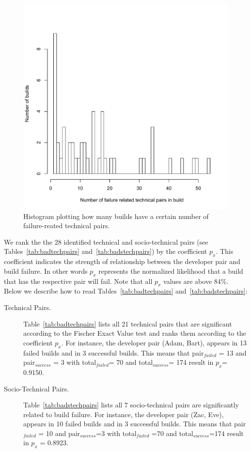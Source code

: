 \documentclass{sig-alternate}
\begin{document}
\begin{figure}[t]
\centering
\vspace{-1cm}
\includegraphics[width=\columnwidth]{builddistribution}
\caption{Histogram plotting how many builds have a certain number of failure-reated technical pairs.}
\label{fig:builddistribution}
\end{figure}


We rank the the 28 identified technical and socio-technical pairs 
(see Tables~\ref{tab:badtechpairs} and~\ref{tab:badstechpairs}) by the coefficient $p_{x}$.
This coefficient indicates the strength of relationship between the developer pair and build failure. 
In other words $p_{x}$ represents the normalized likelihood that a build that has the
respective pair will fail. Note that all $p_{x}$ values are above 84\%. 
Below we describe how to read Tables~\ref{tab:badtechpairs}
and~\ref{tab:badstechpairs}:

\begin{description}
\item[Technical Pairs.] Table~\ref{tab:badtechpairs} lists all 21 technical pairs that are significant
according to the Fischer Exact Value test and ranks them according to the
coefficient $p_x$. For instance, the developer pair (Adam, Bart), appears in 13
failed builds and in 3 successful builds. This means that pair$_{failed}$ = 13
and pair$_{success}$ = 3 with total$_{failed}$= 70 and total$_{success}$= 174
result in $p_x$= 0.9150.
\item[Socio-Technical Pairs.] 
Table~\ref{tab:badstechpairs} lists all 7 socio-technical pairs are
significantly related to build failure. For instance, the developer pair
(Zac, Eve), appears in 10 failed
builds and in 3 successful builds. This means that pair$_{failed}$ = 10 and pair$_{success}$=3 with total$_{failed}$ =70 and total$_{success}$=174 result in $p_x$ = 0.8923.
\end{description}
\end{document}
